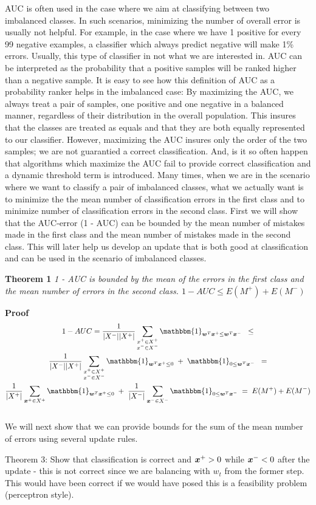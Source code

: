 AUC is often used in the case where we aim at classifying between two imbalanced classes. In such scenarios, minimizing the number of overall error is usually not helpful. For example, in the case where we have 1 positive for every 99 negative examples, a classifier which always predict negative will make 1\% errors. Usually, this type of classifier in not what we are interested in. AUC can be interpreted as the probability that a positive samples will be ranked higher than a negative sample. It is easy to see how this definition of AUC as a probability ranker helps in the imbalanced case:   By maximizing the AUC, we always treat a pair of samples, one positive and one negative in a balanced manner, regardless of their distribution in the overall population. This insures that the classes are treated as equals and that they are both equally represented to our classifier. However, maximizing the AUC insures only the order of the two samples; we are not guarantied a correct classification. And, is it so often happen that algorithms which maximize the AUC fail to provide correct classification and a dynamic threshold term is introduced. Many times, when we are in the scenario where we want to classify a pair of imbalanced classes, what we actually want is to minimize the the mean number of classification errors in the first class and to minimize number of classification errors in the second class. First we will show that the AUC-error (1 - AUC) can be bounded by the mean number of mistakes made in the first class and the mean number of mistakes made in the second class. This will later help us develop an update that is both good at classification and can be used in the scenario of imbalanced classes.

{\bf Theorem 1} {\it 1 - AUC is bounded by the mean 
of the errors in the first class and the mean number of errors in the second
class.  $1 - AUC \leq E(M^+) + E(M^-)$ 
}

{\bf Proof} 
\begin{multline}
1 - AUC = \frac{1}{|X^-| |X^+|} \sum\limits_{ \substack{x^+ \in X^+ \\ x^- \in X^-}} {  \mathbbm{1}_{\vw^T \vx^+ \leq \vw^T \vx^-} } \;\;\leq \\
\frac{1}{|X^-| |X^+|}  \sum\limits_{ \substack{x^+ \in X^+ \\ x^- \in X^-}} {  \mathbbm{1}_{\vw^T \vxp \leq 0} \;+\; \mathbbm{1}_{0 \leq \vw^T \vxn}  }  \;\;= \\
\frac{1}{|X^+|}  \sum\limits_{\vxp \in X^+}{  \mathbbm{1}_{\vw^T \vxp \leq 0} } \;+\; \frac{1}{|X^-|}  \sum\limits_{\vxn \in X^-}{\mathbbm{1}_{0 \leq \vw^T \vxn }  }   \;= \;
E(M^+) + E(M^-)
\end{multline}
\hfill\BlackBox \\


We will next show that we can provide bounds for the sum of the mean number of errors using several update rules.


Theorem 3: Show that classification is correct and $\bm{x}^+ >0$ while $\bm{x}^- < 0$ after the update - this is not correct since we are balancing with $w_t$ from the former step.
This would have been correct if we would have posed this is a feasibility problem (perceptron style).
